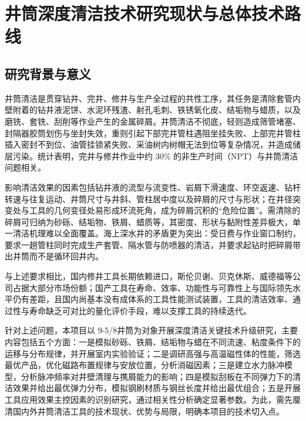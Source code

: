
\chapter{井筒深度清洁技术研究现状与总体技术路线}\label{chap:survey}

\section{研究背景与意义}

井筒清洁是贯穿钻井、完井、修井与生产全过程的共性工序，其任务是清除套管内壁附着的钻井液泥饼、水泥环残渣、射孔毛刺、铁锈氧化皮、结垢物与蜡质，以及磨铣、套铣、刮削等作业产生的金属碎屑。井筒清洁不彻底，轻则造成筛管堵塞、封隔器胶筒划伤与坐封失效，重则引起下部完井管柱遇阻坐挂失败、上部完井管柱插入密封不到位、油管挂锁紧失败、采油树内树帽无法到位等复杂情况，并造成储层污染。统计表明，完井与修井作业中约 30\% 的非生产时间（NPT）与井筒清洁问题相关。

影响清洁效果的因素包括钻井液的流型与流变性、岩屑下滑速度、环空返速、钻杆转速与往复运动、井筒尺寸与井斜、管柱居中度以及碎屑的尺寸与形状；在井径突变处与工具的几何变径处易形成环流死角，成为碎屑沉积的“危险位置”。需清除的碎屑可归纳为砂砾、结垢物、铁屑、蜡质等，其密度、形状与黏附性差异极大，单一清洁机理难以全面覆盖。海上深水井的矛盾更为突出：受日费与作业窗口制约，要求一趟管柱同时完成生产套管、隔水管与防喷器的清洁，并要求起钻时把碎屑带出井筒而不是循环回井内。%

与上述要求相比，国内修井工具长期依赖进口，斯伦贝谢、贝克休斯、威德福等公司占据大部分市场份额；国产工具在寿命、效率、功能性与可靠性上与国际领先水平仍有差距，且国内尚基本没有成体系的工具性能测试装置，工具的清洁效率、通过性与寿命缺乏可对比的量化评价手段，难以支撑工具的持续迭代。

针对上述问题，本项目以 9-5/8\inch 井筒为对象开展深度清洁关键技术升级研究，主要内容包括五个方面：一是模拟砂砾、铁屑、结垢物与蜡在不同流速、粘度条件下的运移与分布规律，并开展室内实验验证；二是调研高强与高温磁性体的性能，筛选最优产品，优化磁路布置规律与安放位置，分析消磁因素；三是建立水力脉冲模型，分析脉冲频率对井壁清理与携屑能力的影响；四是模拟刮板在不同弹力下的清洁效果并给出最优弹力分布，模拟钢刷材质与钢丝长度并给出最优组合；五是开展工具应用效果主控因素的识别研究，通过相关性分析确定显著参数。为此，需先厘清国内外井筒清洁工具的技术现状、优势与局限，明确本项目的技术切入点。

